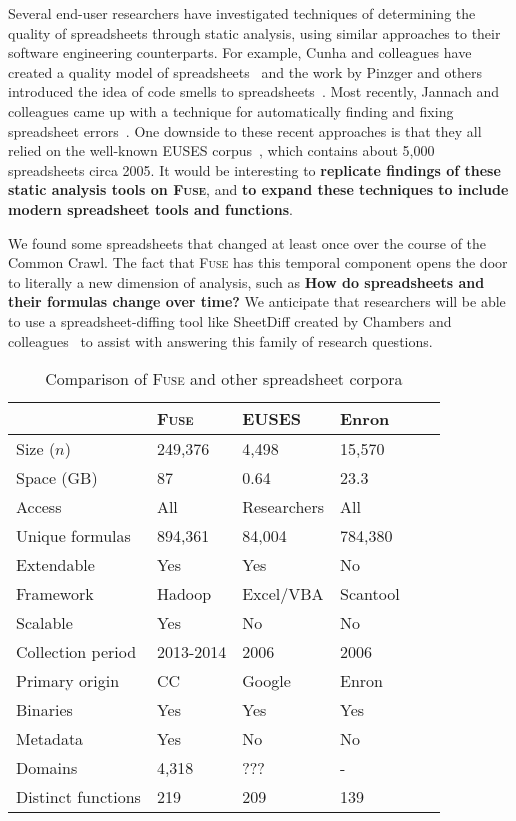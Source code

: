 \documentclass[conference]{IEEEtran}
\begin{document}
Several end-user researchers have investigated techniques of determining the quality of spreadsheets through static analysis, using similar approaches to their software engineering counterparts.
For example, Cunha and colleagues have created a quality model of spreadsheets~\cite{Cunha2012}
and the work by Pinzger and others introduced the idea of code smells to spreadsheets~\cite{Pinzger2012}.
Most recently, Jannach and colleagues came up with a technique for automatically finding and fixing spreadsheet errors~\cite{jannach2014}.
One downside to these recent approaches is that they all relied on the well-known EUSES corpus~\cite{Fisher2005}, which contains about 5,000 spreadsheets circa 2005.
It would be interesting to \textbf{replicate findings of these static analysis tools on \textsc{Fuse}}, and \textbf{to expand these techniques to include modern spreadsheet tools and functions}.

We found some spreadsheets that changed at least once over the course of the Common Crawl.
The fact that \textsc{Fuse} has this temporal component opens the door to literally a new dimension of analysis, such as \textbf{How do spreadsheets and their formulas change over time?}
We anticipate that researchers will be able to use a spreadsheet-diffing tool like SheetDiff created by Chambers and colleagues~\cite{chambers2010} to assist with answering this family of research questions.

\begin{table}[!t]
\caption{Comparison of \textsc{Fuse} and other spreadsheet corpora\label{tab:corpora}}
\centering
\begin{tabular}{llllll}
\toprule
 & \textbf{\textsc{Fuse}} & \textbf{EUSES} & \textbf{Enron} \\
\midrule
Size ($n$) & 249,376 & 4,498 & 15,570\\ 
Space (GB) & 87  & 0.64 & 23.3\\
Access & All & Researchers & All \\
Unique formulas & 894,361 & 84,004 & 784,380 \\
Extendable & Yes & Yes & No\\
Framework & Hadoop & Excel/VBA & Scantool \\
Scalable & Yes & No & No\\
Collection period & 2013-2014 & 2006 & 2006 \\
Primary origin & CC & Google & Enron \\
Binaries & Yes  & Yes & Yes \\
Metadata & Yes & No & No \\
Domains & 4,318 & ??? & - \\
Distinct functions & 219 & 209 & 139 \\
\bottomrule
\end{tabular}
\end{table}
\end{document}
